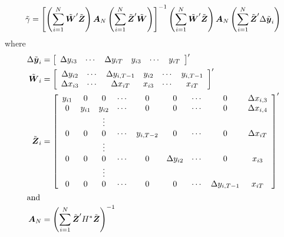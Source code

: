 \begin{equation}
\label{eq:sys-gmm}
  \tilde{\gamma} = \left[ 
    \left( \sum_{i=1}^N \tilde{\boldsymbol{W}}'\tilde{\boldsymbol{Z}} \right) \boldsymbol{A}_N
    \left( \sum_{i=1}^N \tilde{\boldsymbol{Z}}'\tilde{\boldsymbol{W}} \right) \right]^{-1} 
    \left( \sum_{i=1}^N \tilde{\boldsymbol{W}}'\tilde{\boldsymbol{Z}} \right) \boldsymbol{A}_N
    \left( \sum_{i=1}^N \tilde{\boldsymbol{Z}}'\Delta \tilde{\boldsymbol{y}}_i \right)
\end{equation}
where
\begin{align*}
  \Delta \tilde{\boldsymbol{y}}_i  & =
     \left[ \begin{array}{ccccccc}
         \Delta y_{i3} & \cdots & \Delta y_{iT} & y_{i3} & \cdots & y_{iT}
       \end{array} \right]' \\
  \tilde{\boldsymbol{W}}_i  & =
     \left[ \begin{array}{cccccc}
         \Delta y_{i2} & \cdots & \Delta y_{i,T-1} & y_{i2} & \cdots & y_{i,T-1} \\
         \Delta x_{i3} & \cdots & \Delta x_{iT}  & x_{i3} & \cdots & x_{iT} \\
       \end{array} \right]' \\
  \tilde{\boldsymbol{Z}}_i  & =
     \left[ \begin{array}{ccccccccc}
         y_{i1} & 0 & 0       & \cdots & 0  & 0  & \cdots & 0 & \Delta x_{i,3}\\
         0 & y_{i1} & y_{i2} & \cdots & 0  & 0  & \cdots & 0 & \Delta x_{i,4}\\
         & & \vdots \\
         0 & 0 & 0 & \cdots & y_{i, T-2} & 0  & \cdots & 0  & \Delta x_{iT}\\
         & & \vdots \\
         0 & 0 & 0 & \cdots & 0 & \Delta y_{i2} & \cdots & 0  & x_{i3}\\
         & & \vdots \\
         0 & 0 & 0 & \cdots & 0 & 0 & \cdots & \Delta y_{i,T-1}  & x_{iT}\\
       \end{array} \right]' \\
  \intertext{and}
  \boldsymbol{A}_N & = \left( \sum_{i=1}^N \tilde{\boldsymbol{Z}}' H^* \tilde{\boldsymbol{Z}} \right)^{-1}
\end{align*}

